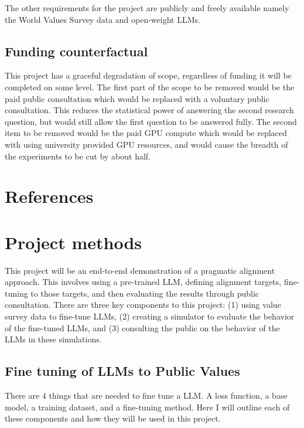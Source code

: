 \documentclass[11pt, a4paper]{article}
\begin{document}
The other requirements for the project are publicly and freely available namely the World Values Survey data and open-weight LLMs.

\subsection{Funding counterfactual}

This project has a graceful degradation of scope, regardless of funding it will be completed on some level. The first part of the scope to be removed would be the paid public consultation which would be replaced with a voluntary public consultation. This reduces the statistical power of answering the second research question, but would still allow the first question to be answered fully. The second item to be removed would be the paid GPU compute which would be replaced with using university provided GPU resources, and would cause the breadth of the experiments to be cut by about half.

\newpage

\section{References}

\printbibliography[heading=none]

\appendix

\section{Project methods}
\label{app:methods}

This project will be an end-to-end demonstration of a pragmatic alignment approach. This involves using a pre-trained LLM, defining alignment targets, fine-tuning to those targets, and then evaluating the results through public consultation. There are three key components to this project: (1) using value survey data to fine-tune LLMs, (2) creating a simulator to evaluate the behavior of the fine-tuned LLMs, and (3) consulting the public on the behavior of the LLMs in these simulations.

\subsection{Fine tuning of LLMs to Public Values}

There are 4 things that are needed to fine tune a LLM. A loss function, a base model, a training dataset, and a fine-tuning method. Here I will outline each of these components and how they will be used in this project.
\end{document}
